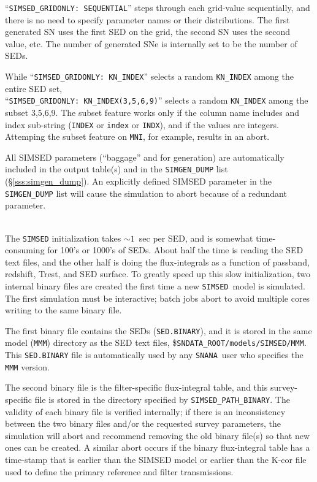 \documentclass[12pt]{article}
\newcommand{\SIMSED}{{\tt SIMSED}}
\newcommand{\snana}{{\tt SNANA}}
\begin{document}
\medskip
``{\tt SIMSED\_GRIDONLY: SEQUENTIAL}''
steps through each grid-value sequentially,
and  there is no need to specify parameter names or their distributions.
The first generated SN  uses the first SED on the grid, 
the second SN uses the second value, etc.  
The number of generated SNe is internally set to be the 
number of SEDs.

While ``{\tt SIMSED\_GRIDONLY: KN\_INDEX}'' selects a random 
{\tt KN\_INDEX} among the entire SED set, \\
``{\tt SIMSED\_GRIDONLY: KN\_INDEX(3,5,6,9)}'' selects a random 
{\tt KN\_INDEX} among the subset 3,5,6,9. 
The subset feature works only if the column name includes
and index sub-string ({\tt INDEX} or {\tt index} or {\tt INDX}),
and if the values are integers. Attemping the subset feature on
{\tt MNI}, for example, results in an abort.

All SIMSED parameters (``baggage'' and for generation)
are automatically included in the output table(s) and
in the {\tt SIMGEN\_DUMP} list (\S\ref{sss:simgen_dump}).
An explicitly defined SIMSED parameter in the {\tt SIMGEN\_DUMP} 
list will cause the simulation to abort because of a redundant parameter.


\bigskip
{} \\
The {\tt SIMSED} initialization takes ${\sim}1$~sec per SED, 
and is somewhat time-consuming for 100's or 1000's of SEDs. 
About half the time is reading the SED text files, and the other half 
is doing the flux-integrals as a function of passband,
redshift, Trest, and SED surface. 
To greatly speed up this slow initialization,
two internal binary files are created
the first time a new \SIMSED\ model is simulated.
The first simulation must be interactive; batch jobs abort to 
avoid multiple cores writing to the same binary file.

The first binary file contains the SEDs ({\tt SED.BINARY}), 
and it is stored in the same model ({\tt MMM}) directory
as the SED text files,
\${\tt SNDATA\_ROOT/models/SIMSED/MMM}.
This {\tt SED.BINARY} file is automatically used
by any \snana\ user who specifies the {\tt MMM} version.


The second binary file is the filter-specific flux-integral table, 
and this survey-specific file is stored in the directory specified by 
{\tt SIMSED\_PATH\_BINARY}.
The validity of each binary file is verified internally; 
if there is an inconsistency between the two binary files
and/or the requested survey parameters, the simulation will 
abort and recommend removing the old binary file(s) so that
new ones can be created. A similar abort occurs if
the binary flux-integral table has a time-stamp
that is earlier than the SIMSED model or earlier than
the K-cor file used to define the primary reference
and filter transmissions.
\end{document}
